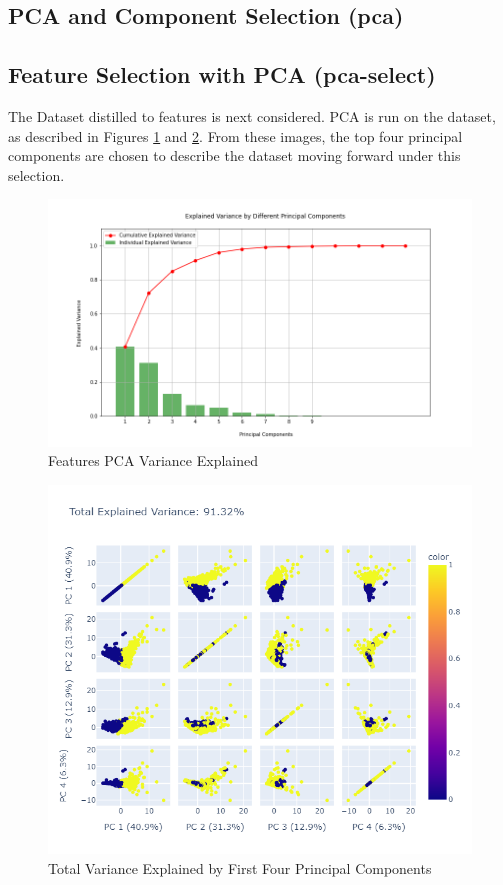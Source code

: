 \documentclass{article}
\begin{document}
\subsection{PCA and Component Selection (pca)}

\subsection{Feature Selection with PCA (pca-select)} \label{pca-select}

The Dataset distilled to features is next considered. PCA is run on the dataset, as described in Figures \ref{feat_pca-varExp} and \ref{feat_pct-varExp}. From these images, the top four principal components are chosen to describe the dataset moving forward under this selection.

\begin{figure}[H]
    \centering
    \includegraphics[width = .9\textwidth]{images/feat_var-exp.png}
    \caption{Features PCA Variance Explained}
    \label{feat_pca-varExp}
\end{figure}

\begin{figure}[H]
    \centering
    \includegraphics[width = .9\textwidth]{images/feat_perc_VarExp.png}
    \caption{Total Variance Explained by First Four Principal Components}
    \label{feat_pct-varExp}
\end{figure}
\end{document}
